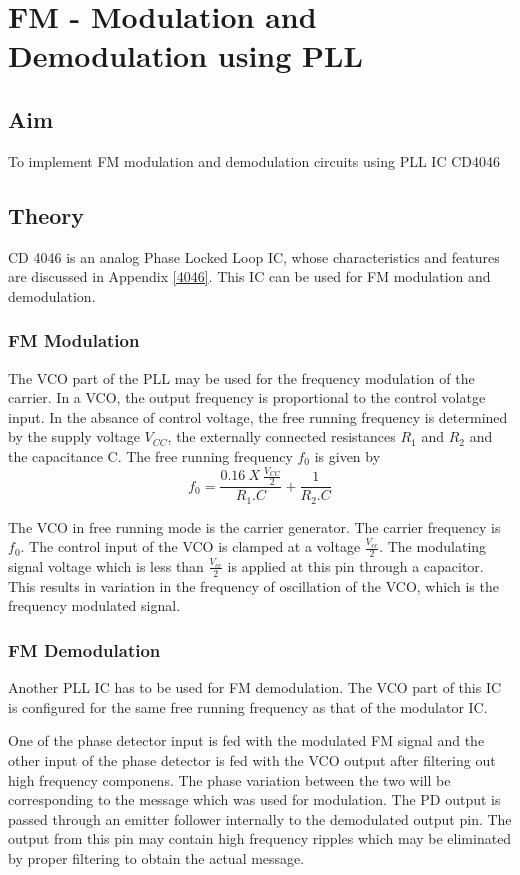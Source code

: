 \chapter[FM - Modulation and Demodulation using PLL]{FM - Modulation and Demodulation using PLL}
\section*{Aim}
To implement FM modulation and demodulation circuits using PLL IC CD4046
\section*{Theory}
CD 4046 is an analog Phase Locked Loop IC, whose characteristics and features are discussed in Appendix \ref{4046}. This IC can be used for FM modulation and demodulation.
\subsection*{FM Modulation}

The VCO part of the PLL may be used for the frequency modulation of the carrier. In a VCO, the output frequency is proportional to the control volatge input. In the absance of control voltage, the free running frequency is determined by the supply voltage $V_{CC}$, the externally connected resistances $R_1$ and $R_2$ and the capacitance C. The free running frequency $f_0$ is given by 
\begin{equation}
\label{f0}
f_0=\frac{0.16\ X\ \frac{V_{CC}}{2} }{R_1.C}+\frac{1}{R_2.C}
\end{equation}

The VCO in free running mode is the carrier generator. The carrier frequency is $f_0$.
 The control input of the VCO is clamped at a voltage $\frac{V_{cc}}{2}$. The modulating signal voltage which is less than $\frac{V_{cc}}{2}$  is applied at this pin through a capacitor. This results in variation in the frequency of oscillation of the VCO, which is the frequency modulated signal.

\subsection*{FM Demodulation}
Another PLL IC has to be used for FM demodulation. The VCO part of this IC is configured for the same free running frequency as that of the modulator IC. 

One of the  phase detector input is fed with the modulated FM signal and the other input of the phase detector is fed with the VCO output after filtering out high frequency componens. The phase variation between the two will be corresponding to the message which was used for modulation. The PD output is passed through an emitter follower internally to the demodulated output pin. The output from this pin may  contain high frequency ripples which may be eliminated by proper filtering to obtain the actual message. 

